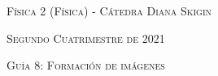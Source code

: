 \documentclass[11pt,spanish]{article}
\begin{document}
    \begin{center}
    \textsc{\large Física 2 (Física) - Cátedra Diana Skigin}
    \par\end{center}{\large \par}
    
    \begin{center}
    \textsc{\large Segundo Cuatrimestre de 2021}
    \par\end{center}{\large \par}
    
    \begin{center}
    \textsc{\large Guía 8: Formación de imágenes}
    \par\end{center}{\large \par}
\end{document}
